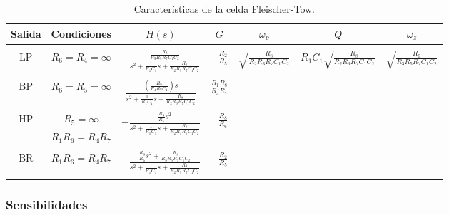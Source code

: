 \begin{table}[H] %
	\centering
	\begin{tabular}{c c c c c c c}
		Salida & Condiciones & $H(s)$ & $G$ & $\omega_p$ & $Q$ & $\omega_z$\\
		\hline \\
		LP&$R_6=R_4=\infty$ &$- \frac{\frac{R_8}{R_3R_5R_7C_1C_2}}{s^2+\frac{1}{R_1C_1}s+\frac{R_8}{R_2R_3R_7C_1C_2}}$& $-\frac{R_2}{R_5}$& \multirow{9}{*}{$\sqrt{\frac{R_8}{R_2R_3R_7C_1C_2}}$}&
		\multirow{9}{*}{$R_1C_1\sqrt{\frac{R_8}{R_2R_3R_7C_1C_2}}$} &\multirow{9}{*}{$\sqrt{\frac{R_6}{R_3 R_5 R_7 C_1 C_2}}$}\\ \\
		BP &$R_6=R_5=\infty$  &$ \frac{\left(\frac{R_8}{R_4R_7C_1}\right)s}{s^2+\frac{1}{R_1C_1}s+\frac{R_8}{R_2R_3R_7C_1C_2}}$&$\frac{R_1R_8}{R_4R_7}$& & &\\ \\
		HP & $R_5=\infty$&\multirow{2}{*}{$- \frac{\frac{R_8}{R_6}s^2}{s^2+\frac{1}{R_1C_1}s+\frac{R_8}{R_2R_3R_7C_1C_2}}$}&\multirow{2}{*}{$-\frac{R_8}{R_6}$}& & &\\ 
		&$R_1R_6=R_4R_7$ & & & & &\\ \\
		BR &$R_1R_6=R_4R_7$ &\multirow{2}{*}{$- \frac{\frac{R_8}{R_6}s^2+\frac{R_8}{R_3R_5R_7C_1C_2}}{s^2+\frac{1}{R_1C_1}s+\frac{R_8}{R_2R_3R_7C_1C_2}}$}&\multirow{2}{*}{$-\frac{R_2}{R_5}$}& & & \\ \\ \\
		\hline
	\end{tabular}
	\caption{Caracter\'isticas de la celda Fleischer-Tow.}
	\label{f_cars}
\end{table}

\subsubsection{Sensibilidades}

